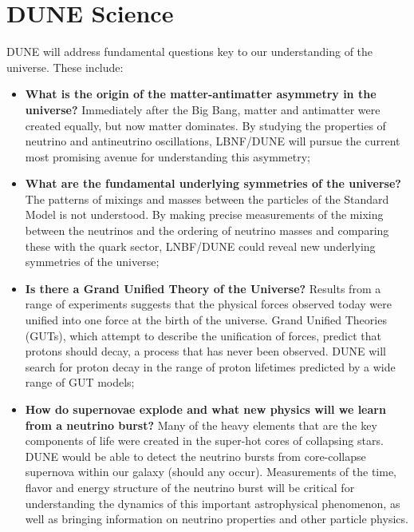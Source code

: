
\chapter{DUNE Science}
\label{v1ch:science}


DUNE will address fundamental questions key to our understanding of the universe. These include:
\begin{itemize}
   \item {\bf What is the origin of the matter-antimatter asymmetry in the universe?} Immediately after
                    the Big Bang, matter and antimatter were created equally, but now matter dominates.
                    By studying the properties of neutrino and antineutrino oscillations, LBNF/DUNE 
                    will pursue the current most promising avenue for understanding this asymmetry;
   \item {\bf What are the fundamental underlying symmetries of the universe?} The patterns of mixings and masses between the particles of the Standard Model is not understood. By making precise measurements of the mixing between the neutrinos and the ordering of neutrino masses and comparing these with the quark sector, LNBF/DUNE could reveal new underlying symmetries of the universe;
  \item{\bf  Is there a Grand Unified Theory of the Universe?} Results from a range of experiments suggests that the
                 physical forces observed today were unified into one force at the birth of the universe.
                Grand Unified Theories (GUTs), which attempt to describe the unification of forces,
                predict that protons should decay, a process that has never been observed. DUNE will 
                search for proton decay in the range of proton lifetimes predicted by a wide range of GUT models;
   \item{\bf How do supernovae explode and what new physics will we learn from a neutrino burst?}
   Many of the heavy elements that are the key components of life were created in the super-hot cores of collapsing stars. DUNE would be able to detect the neutrino bursts from core-collapse supernova within our galaxy (should any occur). Measurements of the time, flavor and energy structure of the neutrino burst will be critical for understanding the dynamics of this important astrophysical phenomenon, as well as bringing information on neutrino properties and other particle physics.
\end{itemize}

